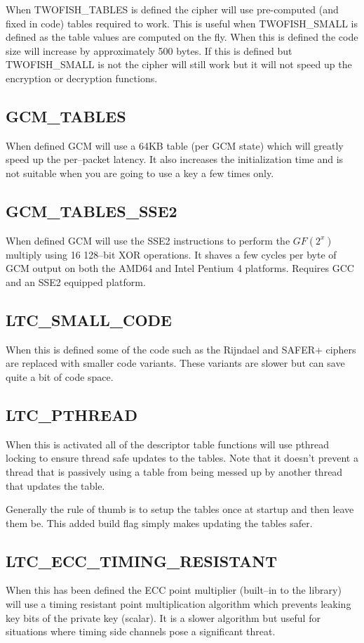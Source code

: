 \documentclass[synpaper]{book}
\begin{document}
When TWOFISH\_TABLES is defined the cipher will use pre-computed (and fixed in code) tables required to work.  This is
useful when TWOFISH\_SMALL is defined as the table values are computed on the fly.  When this is defined the code size
will increase by approximately 500 bytes.  If this is defined but TWOFISH\_SMALL is not the cipher will still work but
it will not speed up the encryption or decryption functions.

\subsection{GCM\_TABLES}
When defined GCM will use a 64KB table (per GCM state) which will greatly speed up the per--packet latency.
It also increases the initialization time and is not suitable when you are going to use a key a few times only.

\subsection{GCM\_TABLES\_SSE2}
When defined GCM will use the SSE2 instructions to perform the $GF(2^x)$ multiply using 16 128--bit XOR operations.  It shaves a few cycles per byte
of GCM output on both the AMD64 and Intel Pentium 4 platforms.  Requires GCC and an SSE2 equipped platform.

\subsection{LTC\_SMALL\_CODE}
When this is defined some of the code such as the Rijndael and SAFER+ ciphers are replaced with smaller code variants.
These variants are slower but can save quite a bit of code space.

\subsection{LTC\_PTHREAD}
When this is activated all of the descriptor table functions will use pthread locking to ensure thread safe updates to the tables.  Note that
it doesn't prevent a thread that is passively using a table from being messed up by another thread that updates the table.

Generally the rule of thumb is to setup the tables once at startup and then leave them be.  This added build flag simply makes updating
the tables safer.

\subsection{LTC\_ECC\_TIMING\_RESISTANT}
When this has been defined the ECC point multiplier (built--in to the library) will use a timing resistant point multiplication
algorithm which prevents leaking key bits of the private key (scalar).  It is a slower algorithm but useful for situations
where timing side channels pose a significant threat.
\end{document}
